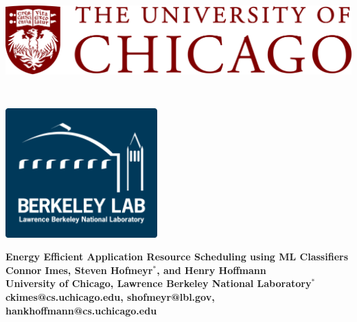 \documentclass[a0,portrait]{a0poster}
\begin{document}

\begin{minipage}[b]{\linewidth}
\begin{center}
\includegraphics[height=5cm]{figures/uchicago_logo.png} %
\hspace{42cm}
\includegraphics[height=5cm]{figures/lbnl_logo.png}
\vspace{0.25cm}
\noindent\makebox[\linewidth]{\rule{0.9\paperwidth}{0.4pt}}
\vspace{0.25cm}
\end{center}

\Huge \color{NavyBlue} \textbf{Energy Efficient Application Resource Scheduling using ML Classifiers} \color{Black}\\[0.5cm] %
\huge \textbf{Connor Imes, Steven Hofmeyr$^*$, and Henry Hoffmann}\\[0.25cm] %
\LARGE \textbf{University of Chicago, Lawrence Berkeley National Laboratory$^*$}\\ %
\Large \textbf{ckimes@cs.uchicago.edu, shofmeyr@lbl.gov, hankhoffmann@cs.uchicago.edu}
\end{minipage}
%
\end{document}
